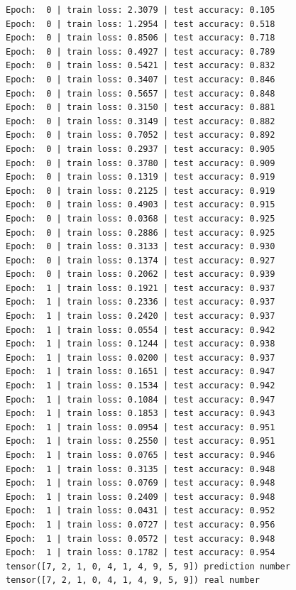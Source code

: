 \documentclass[11pt,UTF8]{ctexart}
\begin{document}
\begin{verbatim}
Epoch:  0 | train loss: 2.3079 | test accuracy: 0.105
Epoch:  0 | train loss: 1.2954 | test accuracy: 0.518
Epoch:  0 | train loss: 0.8506 | test accuracy: 0.718
Epoch:  0 | train loss: 0.4927 | test accuracy: 0.789
Epoch:  0 | train loss: 0.5421 | test accuracy: 0.832
Epoch:  0 | train loss: 0.3407 | test accuracy: 0.846
Epoch:  0 | train loss: 0.5657 | test accuracy: 0.848
Epoch:  0 | train loss: 0.3150 | test accuracy: 0.881
Epoch:  0 | train loss: 0.3149 | test accuracy: 0.882
Epoch:  0 | train loss: 0.7052 | test accuracy: 0.892
Epoch:  0 | train loss: 0.2937 | test accuracy: 0.905
Epoch:  0 | train loss: 0.3780 | test accuracy: 0.909
Epoch:  0 | train loss: 0.1319 | test accuracy: 0.919
Epoch:  0 | train loss: 0.2125 | test accuracy: 0.919
Epoch:  0 | train loss: 0.4903 | test accuracy: 0.915
Epoch:  0 | train loss: 0.0368 | test accuracy: 0.925
Epoch:  0 | train loss: 0.2886 | test accuracy: 0.925
Epoch:  0 | train loss: 0.3133 | test accuracy: 0.930
Epoch:  0 | train loss: 0.1374 | test accuracy: 0.927
Epoch:  0 | train loss: 0.2062 | test accuracy: 0.939
Epoch:  1 | train loss: 0.1921 | test accuracy: 0.937
Epoch:  1 | train loss: 0.2336 | test accuracy: 0.937
Epoch:  1 | train loss: 0.2420 | test accuracy: 0.937
Epoch:  1 | train loss: 0.0554 | test accuracy: 0.942
Epoch:  1 | train loss: 0.1244 | test accuracy: 0.938
Epoch:  1 | train loss: 0.0200 | test accuracy: 0.937
Epoch:  1 | train loss: 0.1651 | test accuracy: 0.947
Epoch:  1 | train loss: 0.1534 | test accuracy: 0.942
Epoch:  1 | train loss: 0.1084 | test accuracy: 0.947
Epoch:  1 | train loss: 0.1853 | test accuracy: 0.943
Epoch:  1 | train loss: 0.0954 | test accuracy: 0.951
Epoch:  1 | train loss: 0.2550 | test accuracy: 0.951
Epoch:  1 | train loss: 0.0765 | test accuracy: 0.946
Epoch:  1 | train loss: 0.3135 | test accuracy: 0.948
Epoch:  1 | train loss: 0.0769 | test accuracy: 0.948
Epoch:  1 | train loss: 0.2409 | test accuracy: 0.948
Epoch:  1 | train loss: 0.0431 | test accuracy: 0.952
Epoch:  1 | train loss: 0.0727 | test accuracy: 0.956
Epoch:  1 | train loss: 0.0572 | test accuracy: 0.948
Epoch:  1 | train loss: 0.1782 | test accuracy: 0.954
tensor([7, 2, 1, 0, 4, 1, 4, 9, 5, 9]) prediction number
tensor([7, 2, 1, 0, 4, 1, 4, 9, 5, 9]) real number
\end{verbatim}

\clearpage
\end{document}
